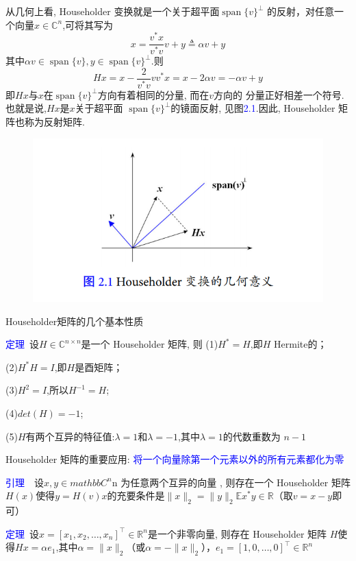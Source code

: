 \documentclass[12pt,a4paper]{article}
\begin{document}
从几何上看, Householder 变换就是一个关于超平面$\operatorname{span}\{v\}^{\perp}$
的反射，对任意一个向量$x \in \mathbb{C}^{n}$,可将其写为$$x=\frac{v^{*} x}{v^{*} v} v+y \triangleq \alpha v+y$$
其中$\alpha v \in \operatorname{span}\{v\}, y \in
\operatorname{span}\{v\}^{\perp}$.则$$H x=x-\frac{2}{v^{*} v} v v^{*} x=x-2 \alpha v=-\alpha v+y$$
即$Hx$与$x$在$\operatorname{span}\{v\}^{\perp}$方向有着相同的分量, 而在$v$方向的
分量正好相差一个符号. 也就是说,$Hx$是$x$关于超平面
$\operatorname{span}\{v\}^{\perp}$的镜面反射, 见图\textcolor{blue}{2.1}.因此, Householder 矩阵也称为反射矩阵.

\begin{figure}
\centering
\includegraphics[scale=0.5]{figure1.png}
\end{figure}

\noindent Householder矩阵的几个基本性质

\noindent \textcolor{blue}{定理}~设$H \in \mathbb{C}^{n \times n}$是一个 Householder 矩阵, 则
(1)$H^*=H$,即$H$ Hermite的；

(2)$H^*H=I$,即$H$是酉矩阵；

(3)$H^2=I$,所以$H^{-1}=H$;

(4)$det(H)=-1$;

(5)$H$有两个互异的特征值:$\lambda=1$和$\lambda=-1$,其中$\lambda=1$的代数重数为
$n-1$

\noindent Householder 矩阵的重要应用:
\textcolor{blue}{将一个向量除第一个元素以外的所有元素都化为零}

\noindent \textcolor{blue}{引理}~~设$x,y \in mathbb{C}^n$n 为任意两个互异的向量
, 则存在一个 Householder 矩阵$H(x)$使得$y=H(v)x$的充要条件是$\|x\|_{2}=\|y\|_{2}
\mathbb{E} x^{*} y \in \mathbb{R}$（取$v=x-y$即可）

\noindent\textcolor{blue}{定理}~设$x=\left[x_{1}, x_{2}, \ldots,
x_{n}\right]^{\top} \in \mathbb{R}^{n}$是一个非零向量, 则存在 Householder 矩阵
$H$使得$Hx=\alpha e_1$,其中$\alpha=\|x\|_2$（或$\alpha=-\|x\|_2$），$e_1=[1,0, \ldots, 0]^{\top} \in \mathbb{R}^{n}$
\end{document}

